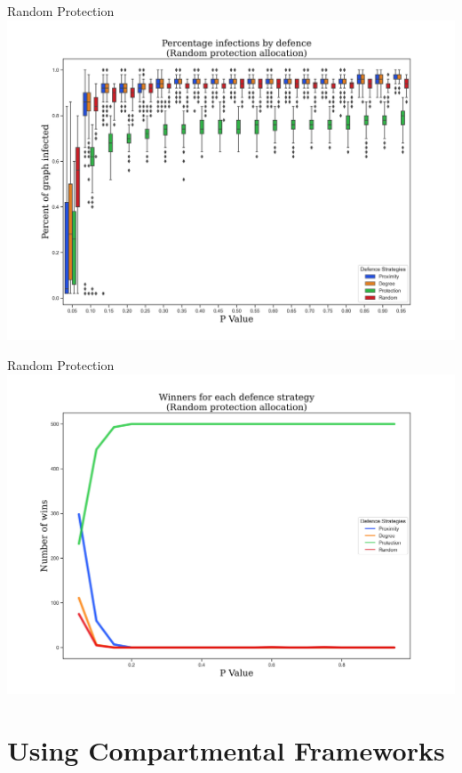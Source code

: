 \documentclass[unknownkeysallowed]{beamer}
\begin{document}
\begin{frame}{Random Protection}
\centering\includegraphics[height=0.8\textheight]{assets/charts/percent_infected/Random.jpg}
\end{frame}


\begin{frame}{Random Protection}
\centering\includegraphics[height=0.8\textheight]{assets/charts/winners/Random.jpg}
\end{frame}

\section{Using Compartmental Frameworks}
\end{document}
